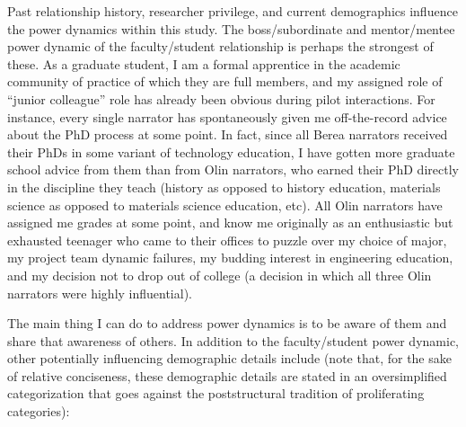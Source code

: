 Past relationship history, researcher privilege, and current demographics influence the power dynamics within this study. The boss/subordinate and mentor/mentee power dynamic of the faculty/student relationship is perhaps the strongest of these. As a graduate student, I am a formal apprentice in the academic community of practice of which they are full members, and my assigned role of “junior colleague” role has already been obvious during pilot interactions. For instance, every single narrator has spontaneously given me off-the-record advice about the PhD process at some point. In fact, since all Berea narrators received their PhDs in some variant of technology education, I have gotten more graduate school advice from them than from Olin narrators, who earned their PhD directly in the discipline they teach (history as opposed to history education, materials science as opposed to materials science education, etc). All Olin narrators have assigned me grades at some point, and know me originally as an enthusiastic but exhausted teenager who came to their offices to puzzle over my choice of major, my project team dynamic failures, my budding interest in engineering education, and my decision not to drop out of college (a decision in which all three Olin narrators were highly influential).

The main thing I can do to address power dynamics is to be aware of them and share that awareness of others. In addition to the faculty/student power dynamic, other potentially influencing demographic details include (note that, for the sake of relative conciseness, these demographic details are stated in an oversimplified categorization that goes against the poststructural tradition of proliferating categories):

